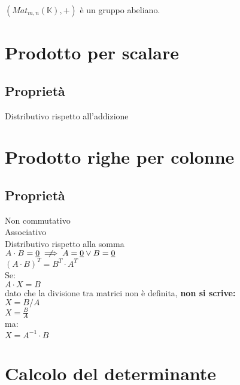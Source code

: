 \documentclass[a4paper, twoside, italian, 11pt]{book}
\newcommand{\K}{\mathbb{K}}
\begin{document}
\noindent
$(Mat_{m,n}(\K), +)$ è un gruppo abeliano.



\section{Prodotto per scalare}



\subsection{Proprietà}

Distributivo rispetto all'addizione



\section{Prodotto righe per colonne}



\subsection{Proprietà}

Non commutativo \\
Associativo \\
Distributivo rispetto alla somma \\

\noindent
$A \cdot B = \underline{0} \centernot\implies A = \underline{0} \lor B = \underline{0}$ \\

\noindent
$(A \cdot B)^T = B^T \cdot A^T$ \\

\noindent
Se: \\

$A \cdot X = B$ \\

\noindent
dato che la divisione tra matrici non è definita, \textbf{non si scrive:} \\

$X = B / A$ \\
\indent
$X = \frac{B}{A}$ \\

\noindent
ma: \\

$X = A^{-1} \cdot B$



\section{Calcolo del determinante}
\end{document}
